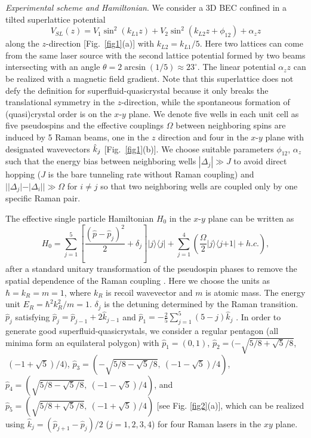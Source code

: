 \documentclass[twocolumn,prl,floatfix,citeautoscript,nofootinbib]{revtex4}
\begin{document}
\emph{Experimental scheme and Hamiltonian}. We consider a 3D BEC confined in
a tilted superlattice potential
\begin{equation}
V_{SL}(z)=V_{1}\sin ^{2}(k_{L1}z)+V_{2}\sin ^{2}(k_{L2}z+\phi _{12})+\alpha
_{z}z
\end{equation}%
along the $z$-direction [Fig.~\ref{fig1}(a)] with $k_{L2}=k_{L1}/5$. Here
two lattices can come from the same laser source with the second lattice
potential formed by two beams intersecting with an angle $\theta =2\arcsin
(1/5)\approx 23^{\circ }$. The linear potential $\alpha _{z}z$ can be
realized with a magnetic field gradient. Note that this superlattice does
not defy the definition for superfluid-quasicrystal because it only breaks
the translational symmetry in the $z$-direction, while the spontaneous
formation of (quasi)crystal order is on the $x$-$y$ plane. We denote five
wells in each unit cell as five pseudospins and the effective couplings $%
\Omega $ between neighboring spins are induced by 5 Raman beams, one in the $%
z$ direction and four in the $x$-$y$ plane with designated wavevectors $\hat{%
k}_{j} $ [Fig.~\ref{fig1}(b)]. We choose suitable parameters $\phi _{12}$, $%
\alpha _{z}$ such that the energy bias between neighboring wells $|\Delta
_{j}|\gg J $ to avoid direct hopping ($J$ is the bare tunneling rate without
Raman coupling) and $||\Delta _{j}|-|\Delta _{i}||\gg \Omega $ for $i\neq j$
so that two neighboring wells are coupled only by one specific Raman pair.

The effective single particle Hamiltonian $H_{0}$ in the $x$-$y$ plane can
be written as%
\begin{equation}
H_{0}=\sum_{j=1}^{5}\left[ \frac{(\hat{p}-\hat{p}_{j})^{2}}{2}+\delta _{j}%
\right] |j\rangle \langle j|+\sum_{j=1}^{4}\left( \frac{\Omega }{2}|j\rangle
\langle j\text{+}1|+h.c.\right) ,
\end{equation}%
after a standard unitary transformation of the pseudospin phases to remove
the spatial dependence of the Raman coupling \cite{MyApp}. Here we choose
the units as $\hbar =k_{R}=m=1$, where $k_{R}$ is recoil wavevector and $m$
is atomic mass. The energy unit $E_{R}=\hbar ^{2}k_{R}^{2}/m=1$. $\delta
_{j} $ is the detuning determined by the Raman transition. $\hat{p}_{j}$
satisfying $\hat{p}_{j}=\hat{p}_{j-1}+2\hat{k}_{j-1}$ and $\hat{p}_{1}=-%
\frac{2}{5}\sum_{j=1}^{5}(5-j)\hat{k}_{j}$ \cite{MyApp}. In order to
generate good superfluid-quasicrystals, we consider a regular pentagon (all
minima form an equilateral polygon) with $\hat{p}_{1}=(0,1)$, $\hat{p}_{2}=(-%
\sqrt{5/8+\sqrt{5}/8}$,$~(-1+\sqrt{5})/4)$, $\hat{p}_{3}=(-\sqrt{5/8-\sqrt{5}%
/8},~(-1-\sqrt{5})/4)$, $\hat{p}_{4}=(\sqrt{5/8-\sqrt{5}/8},~(-1-\sqrt{5}%
)/4) $, and $\hat{p}_{5}=(\sqrt{5/8+\sqrt{5}/8},~(-1+\sqrt{5})/4)$ [see Fig.%
\ref{fig2}(a)], which can be realized using $\hat{k}_{j}=\left( \hat{p}%
_{j+1}-\hat{p}_{j}\right) /2$ ($j=1,2,3,4$) for four Raman lasers in the $xy$
plane.
\end{document}
